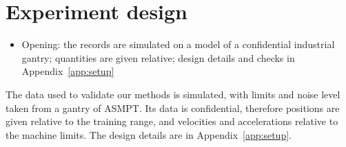 \section{Experiment design}\label{sec:setup}
\ifdraft
\begin{itemize}
\item Opening: the records are simulated on a model of a confidential industrial gantry; quantities are given relative; design details and checks in Appendix~\ref{app:setup}
\end{itemize}
\fi
The data used to validate our methods is simulated, with limits and noise level
taken from a gantry of ASMPT.
Its data is confidential, therefore positions are given relative to the
training range, and velocities and accelerations relative to the machine
limits.
The design details are in Appendix~\ref{app:setup}.
%


